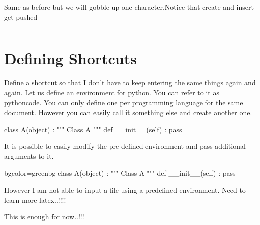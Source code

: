 \documentclass{article}
\begin{document}
\begin{listing}[H]
\caption{Same as before but we will gobble up one character,Notice that create and insert get pushed}
\label{list:list2}
\inputminted[linenos=true,frame=single,firstline=9,lastline=25,showtabs=true,showspaces=true,tabsize=4,firstnumber=9,numberblanklines=false,stepnumber=2,gobble=1]{python}{sql.py}
\end{listing}



\pagebreak

\section{Defining Shortcuts}

Define a shortcut so that I don't have to keep entering the same things again and again. Let us define an environment for python. You can refer to it as pythoncode. You can only define one per programming language for the same document. 
However you can easily call it something else and create another one.




\begin{pythoncode}
class A(object) : 
	""" Class A """
	def __init__(self) : 
		pass
\end{pythoncode}

It is possible to easily modify the pre-defined environment and pass additional arguments to it. 

\begin{pythoncode*}{bgcolor=greenbg}
class A(object) : 
	""" Class A """
	def __init__(self) : 
		pass
\end{pythoncode*}

However I am not able to input a file using a predefined environment. Need to learn more latex..!!!! 

\Large{This is enough for now..!!!}
\end{document}
